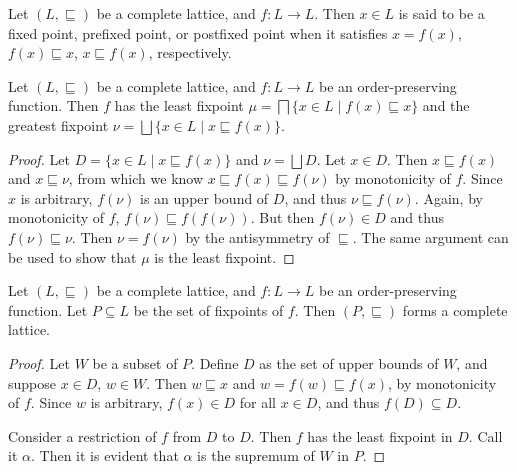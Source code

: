 \documentclass[9pt]{beamer}
\begin{document}
\begin{frame}
  \begin{definition}
    Let $(L,\sqsubseteq)$ be a complete lattice, and $f : L \to L$.
    Then $x \in L$ is said to be a fixed point, prefixed point, or postfixed point when
    it satisfies $x = f(x)$, $f(x) \sqsubseteq x$, $x \sqsubseteq f(x)$, respectively.
  \end{definition}

  \begin{lemma}
    Let $(L,\sqsubseteq)$ be a complete lattice, and $f : L \to L$ be an order-preserving function.
    Then $f$ has the least fixpoint $\mu = \bigsqcap \{x \in L \mid f(x) \sqsubseteq x\}$
    and the greatest fixpoint $\nu = \bigsqcup \{x \in L \mid x \sqsubseteq f(x)\}$.
  \end{lemma}
  \begin{proof}
    Let $D = \{x \in L \mid x \sqsubseteq f(x)\}$ and $\nu = \bigsqcup D$.
    Let $x \in D$.
    Then $x \sqsubseteq f(x)$ and $x \sqsubseteq \nu$, from which we know $x \sqsubseteq f(x) \sqsubseteq f(\nu)$ by monotonicity of $f$.
    Since $x$ is arbitrary, $f(\nu)$ is an upper bound of $D$, and thus $\nu \sqsubseteq f(\nu)$.
    Again, by monotonicity of $f$, $f(\nu) \sqsubseteq f(f(\nu))$.
    But then $f(\nu) \in D$ and thus $f(\nu) \sqsubseteq \nu$.
    Then $\nu = f(\nu)$ by the antisymmetry of $\sqsubseteq$.
    The same argument can be used to show that $\mu$ is the least fixpoint.
  \end{proof}
\end{frame}

\begin{frame}
  \begin{theorem}
    Let $(L,\sqsubseteq)$ be a complete lattice, and $f : L \to L$ be an order-preserving function. Let $P \subseteq L$ be the set of fixpoints of $f$. Then $(P, \sqsubseteq)$ forms a complete lattice.
  \end{theorem}
  \begin{proof}
    Let $W$ be a subset of $P$.
    Define $D$ as the set of upper bounds of $W$, and suppose $x \in D$, $w \in W$.
    Then $w \sqsubseteq x$ and $w = f(w) \sqsubseteq f(x)$, by monotonicity of $f$.
    Since $w$ is arbitrary, $f(x) \in D$ for all $x \in D$, and thus $f(D) \subseteq D$.

    Consider a restriction of $f$ from $D$ to $D$.
    Then $f$ has the least fixpoint in $D$. Call it $\alpha$.
    Then it is evident that $\alpha$ is the supremum of $W$ in $P$.
  \end{proof}
\end{frame}
\end{document}

